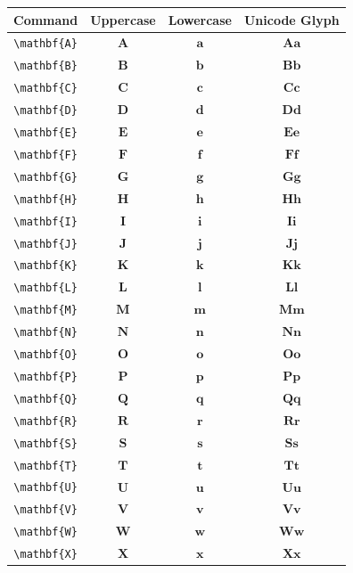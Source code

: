 \documentclass[12pt,a4paper]{article}
\begin{document}
\begin{longtable}{|c|c|c|c|}
\hline
\textbf{Command} & \textbf{Uppercase} & \textbf{Lowercase} & \textbf{Unicode Glyph} \\
\hline
\verb|\mathbf{A}| & $\mathbf{A}$ & $\mathbf{a}$ & $ 𝐀 𝐚 $ \\
\verb|\mathbf{B}| & $\mathbf{B}$ & $\mathbf{b}$ & $ 𝐁 𝐛 $ \\
\verb|\mathbf{C}| & $\mathbf{C}$ & $\mathbf{c}$ & $ 𝐂 𝐜 $ \\
\verb|\mathbf{D}| & $\mathbf{D}$ & $\mathbf{d}$ & $ 𝐃 𝐝 $ \\
\verb|\mathbf{E}| & $\mathbf{E}$ & $\mathbf{e}$ & $ 𝐄 𝐞 $ \\
\verb|\mathbf{F}| & $\mathbf{F}$ & $\mathbf{f}$ & $ 𝐅 𝐟 $ \\
\verb|\mathbf{G}| & $\mathbf{G}$ & $\mathbf{g}$ & $ 𝐆 𝐠 $ \\
\verb|\mathbf{H}| & $\mathbf{H}$ & $\mathbf{h}$ & $ 𝐇 𝐡 $ \\
\verb|\mathbf{I}| & $\mathbf{I}$ & $\mathbf{i}$ & $ 𝐈 𝐢 $ \\
\verb|\mathbf{J}| & $\mathbf{J}$ & $\mathbf{j}$ & $ 𝐉 𝐣 $ \\
\verb|\mathbf{K}| & $\mathbf{K}$ & $\mathbf{k}$ & $ 𝐊 𝐤 $ \\
\verb|\mathbf{L}| & $\mathbf{L}$ & $\mathbf{l}$ & $ 𝐋 𝐥 $ \\
\verb|\mathbf{M}| & $\mathbf{M}$ & $\mathbf{m}$ & $ 𝐌 𝐦 $ \\
\verb|\mathbf{N}| & $\mathbf{N}$ & $\mathbf{n}$ & $ 𝐍 𝐧 $ \\
\verb|\mathbf{O}| & $\mathbf{O}$ & $\mathbf{o}$ & $ 𝐎 𝐨 $ \\
\verb|\mathbf{P}| & $\mathbf{P}$ & $\mathbf{p}$ & $ 𝐏 𝐩 $ \\
\verb|\mathbf{Q}| & $\mathbf{Q}$ & $\mathbf{q}$ & $ 𝐐 𝐪 $ \\
\verb|\mathbf{R}| & $\mathbf{R}$ & $\mathbf{r}$ & $ 𝐑 𝐫 $ \\
\verb|\mathbf{S}| & $\mathbf{S}$ & $\mathbf{s}$ & $ 𝐒 𝐬 $ \\
\verb|\mathbf{T}| & $\mathbf{T}$ & $\mathbf{t}$ & $ 𝐓 𝐭 $ \\
\verb|\mathbf{U}| & $\mathbf{U}$ & $\mathbf{u}$ & $ 𝐔 𝐮 $ \\
\verb|\mathbf{V}| & $\mathbf{V}$ & $\mathbf{v}$ & $ 𝐕 𝐯 $ \\
\verb|\mathbf{W}| & $\mathbf{W}$ & $\mathbf{w}$ & $ 𝐖 𝐰 $ \\
\verb|\mathbf{X}| & $\mathbf{X}$ & $\mathbf{x}$ & $ 𝐗 𝐱 $ \\

\end{longtable}
\end{document}
